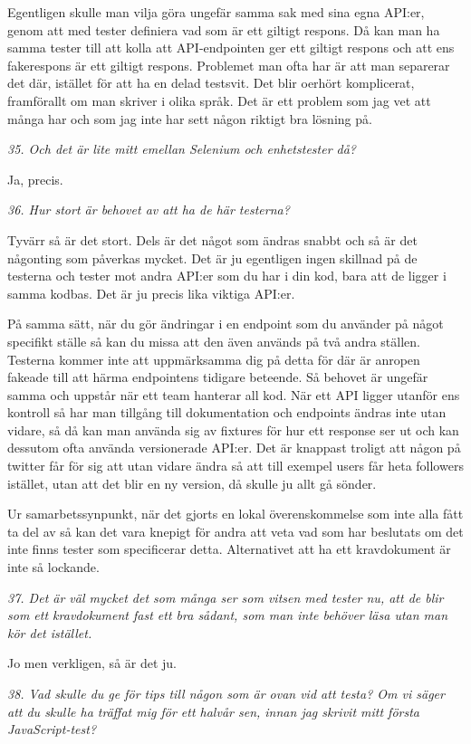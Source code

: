 \documentclass[11pt]{article}
\begin{document}
Egentligen skulle man vilja göra ungefär samma sak med sina egna API:er, genom att med tester definiera vad som är ett giltigt respons. Då kan man ha samma tester till att kolla att API-endpointen ger ett giltigt respons och att ens fakerespons är ett giltigt respons. Problemet man ofta har är att man separerar det där, istället för att ha en delad testsvit. Det blir oerhört komplicerat, framförallt om man skriver i olika språk. Det är ett problem som jag vet att många har och som jag inte har sett någon riktigt bra lösning på.

\emph{35. Och det är lite mitt emellan Selenium och enhetstester då?}

Ja, precis.

\emph{36. Hur stort är behovet av att ha de här testerna?}

Tyvärr så är det stort. Dels är det något som ändras snabbt och så är det någonting som påverkas mycket. Det är ju egentligen ingen skillnad på de testerna och tester mot andra API:er som du har i din kod, bara att de ligger i samma kodbas. Det är ju precis lika viktiga API:er.

På samma sätt, när du gör ändringar i en endpoint som du använder på något specifikt ställe så kan du missa att den även används på två andra ställen. Testerna kommer inte att uppmärksamma dig på detta för där är anropen fakeade till att härma endpointens tidigare beteende. Så behovet är ungefär samma och uppstår när ett team hanterar all kod. När ett API ligger utanför ens kontroll så har man tillgång till dokumentation och endpoints ändras inte utan vidare, så då kan man använda sig av fixtures för hur ett response ser ut och kan dessutom ofta använda versionerade API:er. Det är knappast troligt att någon på twitter får för sig att utan vidare ändra så att till exempel users får heta followers istället, utan att det blir en ny version, då skulle ju allt gå sönder.

Ur samarbetssynpunkt, när det gjorts en lokal överenskommelse som inte alla fått ta del av så kan det vara knepigt för andra att veta vad som har beslutats om det inte finns tester som specificerar detta. Alternativet att ha ett kravdokument är inte så lockande.

\emph{37. Det är väl mycket det som många ser som vitsen med tester nu, att de blir som ett kravdokument fast ett bra sådant, som man inte behöver läsa utan man kör det istället.}

Jo men verkligen, så är det ju.

\emph{38. Vad skulle du ge för tips till någon som är ovan vid att testa? Om vi säger att du skulle ha träffat mig för ett halvår sen, innan jag skrivit mitt första JavaScript-test?}
\end{document}
